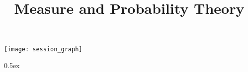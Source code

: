\documentclass[11pt,a4paper]{article}
\begin{document}
\title{Measure and Probability Theory}
\maketitle

\tableofcontents

\begin{center}
  \texttt{[image: session\_graph]}
\end{center}

\renewcommand{\setisabellecontext}[1]{\markright{THEORY~``#1''}}

\parindent 0pt\parskip 0.5ex

\end{document}
